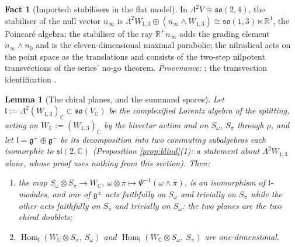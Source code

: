 \documentclass[11pt]{article}
\newtheorem{lemma}[theorem]{Lemma}
\theoremstyle{definition}
\newtheorem{fact}[theorem]{Fact}
\newcommand{\R}{\mathbb{R}}
\newcommand{\C}{\mathbb{C}}
\newcommand{\nO}{n_0}
\newcommand{\nInf}{n_\infty}
\newcommand{\Som}{S_\omega}
\newcommand{\Spi}{S_\pi}
\begin{document}
\begin{fact}[Imported: stabilisers in the flat model]\label{fact:parabolic}
In $\Lambda^2 V \cong \mathfrak{so}(2,4)$, the stabiliser of the null vector $\nInf$ is $\Lambda^2 W_{1,3} \oplus (\nInf\wedge W_{1,3}) \cong \mathfrak{so}(1,3)\ltimes\R^4$, the Poincar\'e algebra; the stabiliser of the ray $\R^+\nInf$ adds the grading element $\nInf\wedge\nO$ and is the eleven-dimensional maximal parabolic; the nilradical acts on the point space as the translations and consists of the two-step nilpotent transvections of the series' no-go theorem. \emph{Provenance:} \cite[Prop.~4.3]{ButlerT6}; the transvection identification \cite[Thm.~4.2]{ButlerT1}.
\end{fact}

\begin{lemma}[The chiral planes, and the summand spaces]\label{lem:homone}
Let $\mathfrak{l} := \Lambda^2 (W_{1,3})_\C \subset \mathfrak{so}(V_\C)$ be the complexified Lorentz algebra of the splitting, acting on $W_\C := (W_{1,3})_\C$ by the bivector action and on $\Som$, $\Spi$ through $\rho$, and let $\mathfrak{l} = \mathfrak{g}^+ \oplus \mathfrak{g}^-$ be its decomposition into two commuting subalgebras each isomorphic to $\mathfrak{sl}(2,\C)$ (Proposition \ref{prop:blind}(1): a statement about $\Lambda^2 W_{1,3}$ alone, whose proof uses nothing from this section). Then:
\begin{enumerate}
\item the map $\Som \otimes \Spi \to W_\C$, $\omega\otimes\pi \mapsto \Psi^{-1}(\omega\wedge\pi)$, is an isomorphism of $\mathfrak{l}$-modules, and one of $\mathfrak{g}^\pm$ acts faithfully on $\Som$ and trivially on $\Spi$ while the other acts faithfully on $\Spi$ and trivially on $\Som$: the two planes are the two chiral doublets;
\item $\operatorname{Hom}_{\mathfrak{l}}(W_\C \otimes \Spi,\ \Som)$ and $\operatorname{Hom}_{\mathfrak{l}}(W_\C \otimes \Som,\ \Spi)$ are one-dimensional.
\end{enumerate}
\end{lemma}
\end{document}

